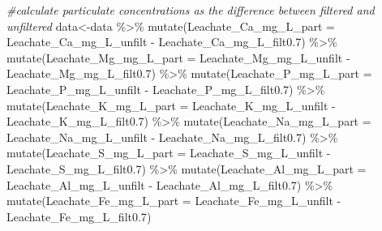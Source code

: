 \documentclass[
]{article}
\newenvironment{Shaded}{\begin{snugshade}}{\end{snugshade}}
\newcommand{\AttributeTok}[1]{\textcolor[rgb]{0.77,0.63,0.00}{#1}}
\newcommand{\CommentTok}[1]{\textcolor[rgb]{0.56,0.35,0.01}{\textit{#1}}}
\newcommand{\FloatTok}[1]{\textcolor[rgb]{0.00,0.00,0.81}{#1}}
\newcommand{\FunctionTok}[1]{\textcolor[rgb]{0.00,0.00,0.00}{#1}}
\newcommand{\NormalTok}[1]{#1}
\newcommand{\OtherTok}[1]{\textcolor[rgb]{0.56,0.35,0.01}{#1}}
\newcommand{\SpecialCharTok}[1]{\textcolor[rgb]{0.00,0.00,0.00}{#1}}
\begin{document}
\begin{Shaded}
\begin{Highlighting}[]
\CommentTok{\#calculate particulate concentrations as the difference between filtered and unfiltered}
\NormalTok{data}\OtherTok{\textless{}{-}}\NormalTok{data }\SpecialCharTok{\%\textgreater{}\%}
  \FunctionTok{mutate}\NormalTok{(}\AttributeTok{Leachate\_Ca\_mg\_L\_part =}\NormalTok{ Leachate\_Ca\_mg\_L\_unfilt }\SpecialCharTok{{-}}\NormalTok{ Leachate\_Ca\_mg\_L\_filt0}\FloatTok{.7}\NormalTok{) }\SpecialCharTok{\%\textgreater{}\%}
  \FunctionTok{mutate}\NormalTok{(}\AttributeTok{Leachate\_Mg\_mg\_L\_part =}\NormalTok{ Leachate\_Mg\_mg\_L\_unfilt }\SpecialCharTok{{-}}\NormalTok{ Leachate\_Mg\_mg\_L\_filt0}\FloatTok{.7}\NormalTok{) }\SpecialCharTok{\%\textgreater{}\%}
  \FunctionTok{mutate}\NormalTok{(}\AttributeTok{Leachate\_P\_mg\_L\_part =}\NormalTok{ Leachate\_P\_mg\_L\_unfilt }\SpecialCharTok{{-}}\NormalTok{ Leachate\_P\_mg\_L\_filt0}\FloatTok{.7}\NormalTok{) }\SpecialCharTok{\%\textgreater{}\%}
  \FunctionTok{mutate}\NormalTok{(}\AttributeTok{Leachate\_K\_mg\_L\_part =}\NormalTok{ Leachate\_K\_mg\_L\_unfilt }\SpecialCharTok{{-}}\NormalTok{ Leachate\_K\_mg\_L\_filt0}\FloatTok{.7}\NormalTok{) }\SpecialCharTok{\%\textgreater{}\%}
  \FunctionTok{mutate}\NormalTok{(}\AttributeTok{Leachate\_Na\_mg\_L\_part =}\NormalTok{ Leachate\_Na\_mg\_L\_unfilt }\SpecialCharTok{{-}}\NormalTok{ Leachate\_Na\_mg\_L\_filt0}\FloatTok{.7}\NormalTok{) }\SpecialCharTok{\%\textgreater{}\%}
  \FunctionTok{mutate}\NormalTok{(}\AttributeTok{Leachate\_S\_mg\_L\_part =}\NormalTok{ Leachate\_S\_mg\_L\_unfilt }\SpecialCharTok{{-}}\NormalTok{ Leachate\_S\_mg\_L\_filt0}\FloatTok{.7}\NormalTok{) }\SpecialCharTok{\%\textgreater{}\%}
  \FunctionTok{mutate}\NormalTok{(}\AttributeTok{Leachate\_Al\_mg\_L\_part =}\NormalTok{ Leachate\_Al\_mg\_L\_unfilt }\SpecialCharTok{{-}}\NormalTok{ Leachate\_Al\_mg\_L\_filt0}\FloatTok{.7}\NormalTok{) }\SpecialCharTok{\%\textgreater{}\%}
  \FunctionTok{mutate}\NormalTok{(}\AttributeTok{Leachate\_Fe\_mg\_L\_part =}\NormalTok{ Leachate\_Fe\_mg\_L\_unfilt }\SpecialCharTok{{-}}\NormalTok{ Leachate\_Fe\_mg\_L\_filt0}\FloatTok{.7}\NormalTok{)}


\end{Highlighting}
\end{Shaded}
\end{document}
